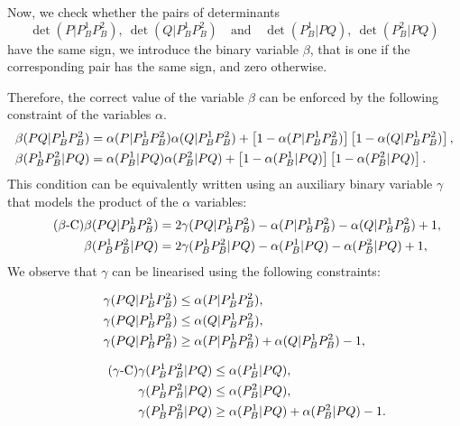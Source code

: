 \documentclass[a4paper,  review, authoryear, 1p.]{elsarticle}
\newcommand{\determinant}[3]{\det({#1|#2#3})}
\begin{document}
	Now, we check whether the pairs of determinants 
	\begin{equation}\label{eq:pair}
		\determinant{P}{P_B^1}{P_B^2},\: \determinant{Q}{P_B^1}{P_B^2}\quad \text{and} \quad \determinant{P_B^1}{P}{Q},\:	 \determinant{P_B^2}{P}{Q}
	\end{equation} 
	have the same sign, we introduce the binary variable $\beta$, that is one if the corresponding pair has the same sign, and zero otherwise.
	
	\newcommand{\gammaprod}[4]{\gamma(#1#2|#3#4)}
	
	Therefore, the correct value of the variable $\beta$ can be enforced by the following constraint of the variables $\alpha$.
	\begin{align*}%
		\betamas{P}{Q}{P_B^1}{P_B^2}&=\alphamas{P}{P_B^1}{P_B^2}\alphamas{Q}{P_B^1}{P_B^2} + \left[1-\alphamas{P}{P_B^1}{P_B^2}\right]\left[1-\alphamas{Q}{P_B^1}{P_B^2}\right],\\
		\betamas{P_B^1}{P_B^2}{P}{Q}&=\alphamas{P_B^1}{P}{Q}\alphamas{P_B^2}{P}{Q} + \left[1-\alphamas{P_B^1}{P}{Q}\right]\left[1-\alphamas{P_B^2}{P}{Q}\right].
	\end{align*}
	This condition can be equivalently written using an auxiliary binary variable $\gamma$ that models the product of the $\alpha$ variables:
	\begin{align*}\tag{$\beta$-C}\label{eq:betaC}
		\betamas{P}{Q}{P_B^1}{P_B^2}&=2\gammaprod{P}{Q}{P_B^1}{P_B^2} -\alphamas{P}{P_B^1}{P_B^2}-\alphamas{Q}{P_B^1}{P_B^2}+1,\\
		\betamas{P_B^1}{P_B^2}{P}{Q}&=2\gammaprod{P_B^1}{P_B^2}{P}{Q} -\alphamas{P_B^1}{P}{Q}-\alphamas{P_B^2}{P}{Q}+1,
	\end{align*}
	We observe that $\gamma$ can be linearised using the following constraints:
	
	\begin{minipage}{.5\linewidth}
		\begin{align*}
			\gammaprod{P}{Q}{P_B^1}{P_B^2} & \leq \alphamas{P}{P_B^1}{P_B^2},\\
			\gammaprod{P}{Q}{P_B^1}{P_B^2} & \leq \alphamas{Q}{P_B^1}{P_B^2},\\
			\gammaprod{P}{Q}{P_B^1}{P_B^2} & \geq \alphamas{P}{P_B^1}{P_B^2} + \alphamas{Q}{P_B^1}{P_B^2} - 1,
		\end{align*}
	\end{minipage}
	\begin{minipage}{.5\linewidth}
		\begin{align*}\tag{$\gamma$-C}\label{eq:gammaC}
			\gammaprod{P_B^1}{P_B^2}{P}{Q} & \leq \alphamas{P_B^1}{P}{Q},\\
			\gammaprod{P_B^1}{P_B^2}{P}{Q} & \leq \alphamas{P_B^2}{P}{Q},\\
			\gammaprod{P_B^1}{P_B^2}{P}{Q} & \geq \alphamas{P_B^1}{P}{Q} + \alphamas{P_B^2}{P}{Q} - 1.
		\end{align*}
	\end{minipage}
	
\end{document}
